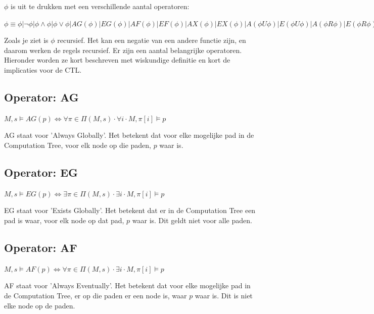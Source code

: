 \documentclass{article}
\begin{document}
		\( \phi \) is uit te drukken met een verschillende aantal operatoren:

		\( \phi \equiv \phi | \neg \phi | \phi \land \phi | \phi \lor \phi | AG(\phi) | EG(\phi) | AF(\phi) | EF(\phi) | AX(\phi) | EX(\phi) | A(\phi U \phi) | E(\phi U \phi) | A (\phi R \phi) | E(\phi R \phi) \)

		Zoals je ziet is \( \phi \) recursief. Het kan een negatie van een andere functie zijn, en daarom werken de regels recursief. Er zijn een aantal belangrijke operatoren. Hieronder worden ze kort beschreven met wiskundige definitie en kort de implicaties voor de CTL.
		
		\subsection{Operator: AG}
				
		\( M, s \models AG(p) \iff \forall \pi \in \Pi (M, s) \cdot \forall i \cdot M, \pi [i] \models p\)

		AG staat voor 'Always Globally'. Het betekent dat voor elke mogelijke pad in de Computation Tree, voor elk node op die paden, \( p \) waar is.
		
		\subsection{Operator: EG}
				
		\( M, s \models EG(p) \iff \exists \pi \in \Pi (M, s) \cdot \exists i \cdot M, \pi [i] \models p\)

		EG staat voor 'Exists Globally'. Het betekent dat er in de Computation Tree een pad is waar, voor elk node op dat pad, \( p \) waar is. Dit geldt niet voor alle paden.
		
		\subsection{Operator: AF}
				
		\( M, s \models AF(p) \iff \forall \pi \in \Pi (M, s) \cdot \exists i \cdot M, \pi [i] \models p\)

		AF staat voor 'Always Eventually'. Het betekent dat voor elke mogelijke pad in de Computation Tree, er op die paden er een node is, waar \( p \) waar is. Dit is niet elke node op de paden.
		
\end{document}

